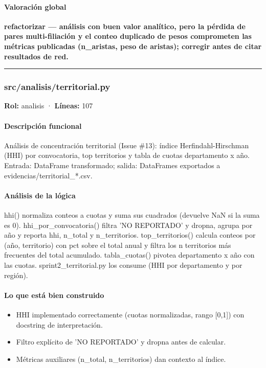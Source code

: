\paragraph{Valoración global}
\textbf{refactorizar --- análisis con buen valor analítico, pero la pérdida de pares multi-filiación y el conteo duplicado de pesos comprometen las métricas publicadas (n\_aristas, peso de aristas); corregir antes de citar resultados de red.}

\medskip
\hrule

\subsubsection{src/analisis/territorial.py}
\textbf{Rol:} analisis · \textbf{Líneas:} 107

\paragraph{Descripción funcional}
Análisis de concentración territorial (Issue \#13): índice Herfindahl-Hirschman (HHI) por convocatoria, top territorios y tabla de cuotas departamento x año. Entrada: DataFrame transformado; salida: DataFrames exportados a evidencias/territorial\_*.csv.

\paragraph{Análisis de la lógica}
hhi() normaliza conteos a cuotas y suma sus cuadrados (devuelve NaN si la suma es 0). hhi\_por\_convocatoria() filtra 'NO REPORTADO' y dropna, agrupa por año y reporta hhi, n\_total y n\_territorios. top\_territorios() calcula conteos por (año, territorio) con pct sobre el total anual y filtra los n territorios más frecuentes del total acumulado. tabla\_cuotas() pivotea departamento x año con las cuotas. sprint2\_territorial.py los consume (HHI por departamento y por región).

\paragraph{Lo que está bien construido}
\begin{itemize}
  \item HHI implementado correctamente (cuotas normalizadas, rango [0,1]) con docstring de interpretación.
  \item Filtro explícito de 'NO REPORTADO' y dropna antes de calcular.
  \item Métricas auxiliares (n\_total, n\_territorios) dan contexto al índice.
\end{itemize}

